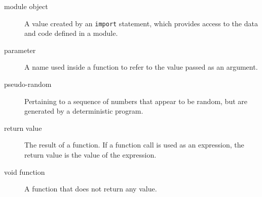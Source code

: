 \begin{description}
\item[module object]
A value created by an \texttt{import} statement, which provides access to the data and code defined in a module.
\end{description}

\begin{description}
\item[parameter]
A name used inside a function to refer to the value passed as an argument.
\end{description}

\begin{description}
\item[pseudo-random]
Pertaining to a sequence of numbers that appear to be random, but are generated by a deterministic program.
\end{description}

\begin{description}
\item[return value]
The result of a function. If a function call is used as an expression, the return value is the value of the expression.
\end{description}

\begin{description}
\item[void function]
A function that does not return any value.
\end{description}


